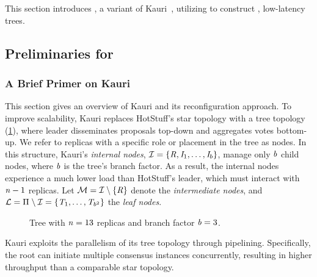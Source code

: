 \section{\optitree}
\label{sec:optitree}

This section introduces \optitree, a variant of Kauri~\cite{kauri}, utilizing \sysname to construct \validt, low-latency trees.

\subsection{Preliminaries for \optitree}
\label{sec:optitree-prelim}

\subsubsection{A Brief Primer on Kauri}
\label{sec:kauri}

This section gives an overview of Kauri and its reconfiguration approach.
To improve scalability, Kauri replaces HotStuff's star topology with a tree topology (\cref{fig:plain-tree}), where leader \nr disseminates proposals top-down and aggregates votes bottom-up.
We refer to replicas with a specific role or placement in the tree as nodes.
In this structure, Kauri's \textit{internal nodes}, $\mathcal{I} = \{\mathit{R}, \mathit{I}_1, \ldots, \mathit{I}_b\}$, manage only $\mathit{b}$ child nodes, where $\mathit{b}$ is the tree's branch factor.
As a result, the internal nodes experience a much lower load than HotStuff's leader, which must interact with $\mathit{n}-1$ replicas.
Let $\mathcal{M} = \mathcal{I} \setminus \{\mathit{R}\}$ denote the \textit{intermediate nodes}, and $\mathcal{L} = \Pi_{} \setminus \mathcal{I} = \{\mathit{T}_{1}, \ldots, \mathit{T}_{b^2}\}$ the \textit{leaf nodes}.

\begin{figure}[hbt]
  \centering
  
  \caption{Tree with $\mathit{n}=13$ replicas and branch factor $\mathit{b}=3$.}
  \label{fig:plain-tree}
\end{figure}

Kauri exploits the parallelism of its tree topology through pipelining.
Specifically, the root can initiate multiple consensus instances concurrently, resulting in higher throughput than a comparable star topology.

